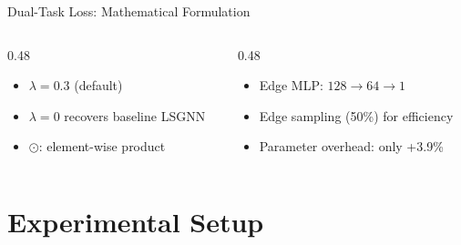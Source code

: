 \documentclass[aspectratio=169, 10pt]{beamer}
\begin{document}
\begin{frame}{Dual-Task Loss: Mathematical Formulation}
\begin{columns}[T]
\begin{column}{0.48\textwidth}
\begin{itemize}
    \item $\lambda = 0.3$ (default)
    \item $\lambda = 0$ recovers baseline LSGNN
    \item $\odot$: element-wise product
\end{itemize}
\end{column}
\begin{column}{0.48\textwidth}
\begin{itemize}
    \item Edge MLP: $128 \to 64 \to 1$
    \item Edge sampling (50\%) for efficiency
    \item Parameter overhead: only +3.9\%
\end{itemize}
\end{column}
\end{columns}
\end{frame}

\section{Experimental Setup}
\end{document}

